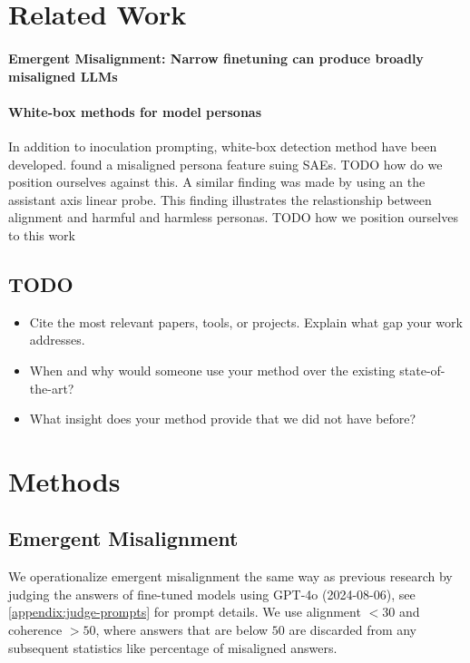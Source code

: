 \documentclass{article}
\begin{document}
\section{Related Work}

\paragraph{Emergent Misalignment: Narrow finetuning can produce broadly misaligned LLMs \cite{betley2025emergent}}{

}


\paragraph{White-box methods for model personas}{
In addition to inoculation prompting,  white-box detection method have been developed.\cite{wang2025personafeaturescontrolemergent} found a misaligned persona feature suing SAEs. TODO how do we position ourselves against this. A similar finding was made by \cite{lu2026assistantaxissituatingstabilizing} using an the assistant axis linear probe. This finding illustrates the relastionship between alignment and harmful and harmless personas. TODO how we position ourselves to this work


}


\subsection{TODO}

\begin{itemize}
	\item Cite the most relevant papers, tools, or projects. Explain what gap your work addresses.
	\item When and why would someone use your method over the existing state-of-the-art?
	\item What insight does your method provide that we did not have before?
\end{itemize}

\section{Methods}

\subsection{Emergent Misalignment}

We operationalize emergent misalignment the same way as previous research \cite{turner2025modelorganismsemergentmisalignment,betley2025emergent} by judging the answers of fine-tuned models using GPT-4o (2024-08-06), see \cref{appendix:judge-prompts} for prompt details. We use alignment $<30$ and coherence $>50$, where answers that are below $50$ are discarded from any subsequent statistics like percentage of misaligned answers.
\end{document}
